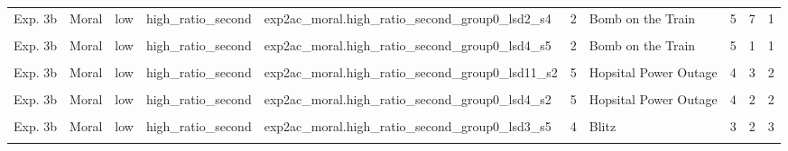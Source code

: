 \documentclass[
]{article}
\begin{document}
\begin{longtable}[t]{lllllrlrrr}
Exp. 3b & Moral & low & high\_ratio\_second & exp2ac\_moral.high\_ratio\_second\_group0\_lsd2\_s4 & 2 & Bomb on the Train & 5 & 7 & 1\\
\addlinespace
\cellcolor{gray!10}{Exp. 3b} & \cellcolor{gray!10}{Moral} & \cellcolor{gray!10}{low} & \cellcolor{gray!10}{high\_ratio\_second} & \cellcolor{gray!10}{exp2ac\_moral.high\_ratio\_second\_group0\_lsd3\_s4} & \cellcolor{gray!10}{2} & \cellcolor{gray!10}{Bomb on the Train} & \cellcolor{gray!10}{5} & \cellcolor{gray!10}{2} & \cellcolor{gray!10}{1}\\
Exp. 3b & Moral & low & high\_ratio\_second & exp2ac\_moral.high\_ratio\_second\_group0\_lsd4\_s5 & 2 & Bomb on the Train & 5 & 1 & 1\\
\cellcolor{gray!10}{Exp. 3b} & \cellcolor{gray!10}{Moral} & \cellcolor{gray!10}{low} & \cellcolor{gray!10}{high\_ratio\_second} & \cellcolor{gray!10}{exp2ac\_moral.high\_ratio\_second\_group0\_lsd5\_s2} & \cellcolor{gray!10}{2} & \cellcolor{gray!10}{Bomb on the Train} & \cellcolor{gray!10}{5} & \cellcolor{gray!10}{1} & \cellcolor{gray!10}{1}\\
Exp. 3b & Moral & low & high\_ratio\_second & exp2ac\_moral.high\_ratio\_second\_group0\_lsd11\_s2 & 5 & Hopsital Power Outage & 4 & 3 & 2\\
\cellcolor{gray!10}{Exp. 3b} & \cellcolor{gray!10}{Moral} & \cellcolor{gray!10}{low} & \cellcolor{gray!10}{high\_ratio\_second} & \cellcolor{gray!10}{exp2ac\_moral.high\_ratio\_second\_group0\_lsd2\_s3} & \cellcolor{gray!10}{5} & \cellcolor{gray!10}{Hopsital Power Outage} & \cellcolor{gray!10}{4} & \cellcolor{gray!10}{6} & \cellcolor{gray!10}{1}\\
\addlinespace
Exp. 3b & Moral & low & high\_ratio\_second & exp2ac\_moral.high\_ratio\_second\_group0\_lsd4\_s2 & 5 & Hopsital Power Outage & 4 & 2 & 2\\
\cellcolor{gray!10}{Exp. 3b} & \cellcolor{gray!10}{Moral} & \cellcolor{gray!10}{low} & \cellcolor{gray!10}{high\_ratio\_second} & \cellcolor{gray!10}{exp2ac\_moral.high\_ratio\_second\_group0\_lsd6\_s1} & \cellcolor{gray!10}{5} & \cellcolor{gray!10}{Hopsital Power Outage} & \cellcolor{gray!10}{4} & \cellcolor{gray!10}{8} & \cellcolor{gray!10}{2}\\
Exp. 3b & Moral & low & high\_ratio\_second & exp2ac\_moral.high\_ratio\_second\_group0\_lsd3\_s5 & 4 & Blitz & 3 & 2 & 3\\
\cellcolor{gray!10}{Exp. 3b} & \cellcolor{gray!10}{Moral} & \cellcolor{gray!10}{low} & \cellcolor{gray!10}{high\_ratio\_second} & \cellcolor{gray!10}{exp2ac\_moral.high\_ratio\_second\_group0\_lsd6\_s3} & \cellcolor{gray!10}{4} & \cellcolor{gray!10}{Blitz} & \cellcolor{gray!10}{3} & \cellcolor{gray!10}{1} & \cellcolor{gray!10}{1}\\

\end{longtable}
\end{document}
